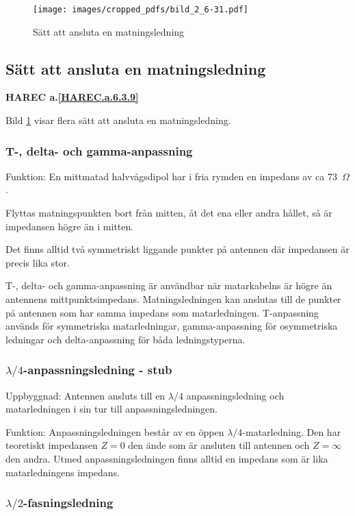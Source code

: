 \begin{figure}
  \texttt{[image: images/cropped\_pdfs/bild\_2\_6-31.pdf]}
  \caption{Sätt att ansluta en matningsledning}
  \label{fig:bildII6-31}
\end{figure}

\subsection{Sätt att ansluta en matningsledning}
\textbf{
HAREC a.\ref{HAREC.a.6.3.9}\label{myHAREC.a.6.3.9}
}

Bild \ref{fig:bildII6-31} visar flera sätt att ansluta en matningsledning.

\subsubsection{T-, delta- och gamma-anpassning}

Funktion:
En mittmatad halvvågsdipol har i fria rymden en impedans av ca 73~\(\Omega\).

Flyttas matningspunkten bort från mitten, åt det ena eller andra
hållet, så är impedansen högre än i mitten.

Det finns alltid två symmetriskt liggande punkter på antennen där
impedansen är precis lika stor.

T-, delta- och gamma-anpassning är användbar när matarkabelns är högre
än antennens mittpunktsimpedans.
Matningsledningen kan anslutas till de punkter på antennen som har samma
impedans som matarledningen.
T-anpassning används för symmetriska matarledningar, gamma-anpassning för
osymmetriska ledningar och delta-anpassning för båda ledningstyperna.

\subsubsection{\(\lambda/4\)-anpassningsledning - stub}

Uppbyggnad: Antennen ansluts till en \(\lambda/4\) anpassningsledning
och matarledningen i sin tur till anpassningsledningen.

Funktion: Anpassningsledningen består av en öppen \(\lambda/4\)-matarledning.
Den har teoretiskt impedansen \(Z = 0\) den ände som är ansluten till antennen
och \(Z = \infty\) den andra.
Utmed anpassningsledningen finns alltid en impedans som är lika matarledningens
impedans.

\subsubsection{$\lambda/2$-fasningsledning}

